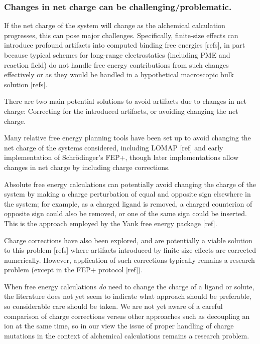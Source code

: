 \documentclass[9pt,bestpractices]{livecoms}
\begin{document}
\subsubsection{Changes in net charge can be challenging/problematic.}

If the net charge of the system will change as the alchemical calculation progresses, this can pose major challenges.
Specifically, finite-size effects can introduce profound artifacts into computed binding free energies [refs], in part because typical schemes for long-range electrostatics (including PME and reaction field) do not handle free energy contributions from such changes effectively or as they would be handled in a hypothetical macroscopic bulk solution [refs].

There are two main potential solutions to avoid artifacts due to changes in net charge: Correcting for the introduced artifacts, or avoiding changing the net charge.

Many relative free energy planning tools have been set up to avoid changing the net charge of the systems considered, including LOMAP [ref] and early implementation of Schr\"{o}dinger's FEP+, though later implementations allow changes in net charge by including charge corrections.

Absolute free energy calculations can potentially avoid changing the charge of the system by making a charge perturbation of equal and opposite sign elsewhere in the system; for example, as a charged ligand is removed, a charged counterion of opposite sign could also be removed, or one of the same sign could be inserted.
This is the approach employed by the Yank free energy package [ref].

Charge corrections have also been explored, and are potentially a viable solution to this problem [refs] where artifacts introduced by finite-size effects are corrected numerically.
However, application of such corrections typically remains a research problem (except in the FEP+ protocol [ref]).

When free energy calculations \emph{do} need to change the charge of a ligand or solute, the literature does not yet seem to indicate what approach should be preferable, so considerable care should be taken.
We are not yet aware of a careful comparison of charge corrections versus other approaches such as decoupling an ion at the same time, so in our view the issue of proper handling of charge mutations in the context of alchemical calculations remains a research problem.
\end{document}
